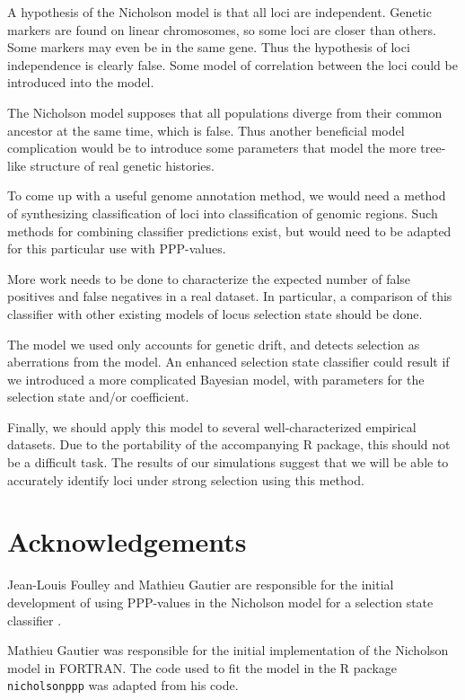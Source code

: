 \documentclass[a4paper,12pt]{article}
\begin{document}
A hypothesis of the Nicholson model is that all loci are
independent. Genetic markers are found on linear chromosomes, so some
loci are closer than others. Some markers may even be in the same
gene. Thus the hypothesis of loci independence is clearly false. Some
model of correlation between the loci could be introduced into the
model.

The Nicholson model supposes that all populations diverge from their
common ancestor at the same time, which is false. Thus another
beneficial model complication would be to introduce some parameters
that model the more tree-like structure of real genetic histories.

To come up with a useful genome annotation method, we would need a
method of synthesizing classification of loci into classification of
genomic regions. Such methods for combining classifier predictions
exist, but would need to be adapted for this particular use with
PPP-values.

More work needs to be done to characterize the expected number of
false positives and false negatives in a real dataset. In particular,
a comparison of this classifier with other existing models of locus
selection state should be done.

The model we used only accounts for genetic drift, and detects
selection as aberrations from the model. An enhanced selection state
classifier could result if we introduced a more complicated Bayesian
model, with parameters for the selection state and/or coefficient.

Finally, we should apply this model to several well-characterized
empirical datasets. Due to the portability of the accompanying R
package, this should not be a difficult task. The results of our
simulations suggest that we will be able to accurately identify loci
under strong selection using this method.

\section{Acknowledgements}

Jean-Louis Foulley and Mathieu Gautier are responsible for the initial
development of using PPP-values in the Nicholson model for a selection
state classifier \cite{foulley-gautier}.

Mathieu Gautier was responsible for the initial implementation of the
Nicholson model in FORTRAN. The code used to fit the model in the R
package \texttt{nicholsonppp} was adapted from his code.
\end{document}
